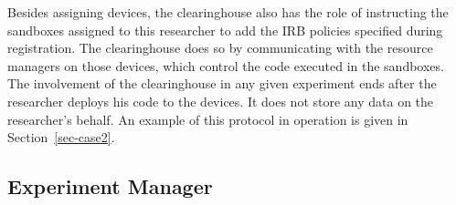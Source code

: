 Besides assigning devices, the clearinghouse also has the role of 
instructing the sandboxes assigned to this researcher to add the IRB 
policies specified during registration. The clearinghouse does so 
by communicating with the resource managers on those devices, which 
control the code executed in the sandboxes. The involvement of the 
clearinghouse in any given experiment ends 
after the researcher deploys his code to the devices. It does not store any
data on the researcher's behalf. An example 
of this protocol in operation is given in Section~\ref{sec-case2}.


%




\subsection{Experiment Manager}\label{sec-emt}

